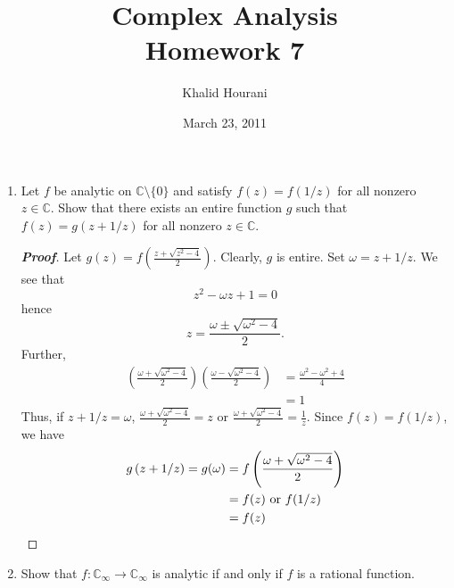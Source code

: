 \documentclass[12pt,leqno]{article}
\title{Complex Analysis\\\large Homework 7}
\date{March 23, 2011}
\author{Khalid Hourani}
\theoremstyle{definition}
\newcommand{\C}{\mathbb{C}}
\newcommand{\w}{\omega}
\newenvironment{Proof}{\begin{proof}[\textnormal{\textbf{Proof}}]}{\end{proof}}
\begin{document}
 \begin{titlepage}
  \maketitle
 \end{titlepage}
\clearpage\mbox{}\clearpage

\setcounter{page}{1}
\begin{enumerate}
 \item Let $f$ be analytic on $\C\setminus\{0\}$ and satisfy $f(z)=f(1/z)$ for all nonzero $z\in\C$. Show that there exists an entire function $g$ such that $f(z)=g(z+1/z)$ for all nonzero $z\in\C$. 
  \begin{Proof}
   Let $g(z)=f\left(\frac{z+\sqrt{z^2-4}}{2}\right)$. Clearly, $g$ is entire. Set $\w=z+1/z$. We see that \[z^2-\w z+1=0\] hence \[z=\frac{\w\pm\sqrt{\w^2-4}}{2}.\] Further, \begin{align*}\left(\frac{\w+\sqrt{\w^2-4}}{2}\right)\left(\frac{\w-\sqrt{\w^2-4}}{2}\right)&=\frac{\w^2-\w^2+4}{4}\\&=1\end{align*} Thus, if $z+1/z=\w$, $\frac{\w+\sqrt{\w^2-4}}{2}=z$ or $\frac{\w+\sqrt{\w^2-4}}{2}=\frac{1}{z}$. Since $f(z)=f(1/z)$, we have \begin{align*}g\left(z+1/z\right)=g(\w)&=f\left(\frac{\w+\sqrt{\w^2-4}}{2}\right)\\&=f(z)\text{ or }f(1/z)\\&=f(z)\qedhere\end{align*}
  \end{Proof}
 \item Show that $f:\C_{\infty}\to\C_{\infty}$ is analytic if and only if $f$ is a rational function.
\end{enumerate}
\end{document}
